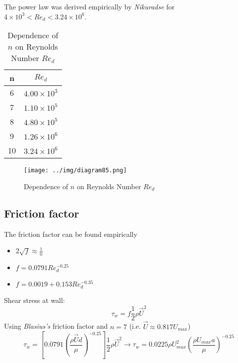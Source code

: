 \documentclass[class=report, crop=false, 12pt,a4paper]{standalone}
\begin{document}
The power law was derived empirically by \textit{Nikuradse} for $4\times10^3 < Re_d < 3.24 \times 10^6$.
\begin{table}[H]
  \begin{center}
  \begin{tabular}{|c|c|}
    \hline
    \textbf{n} & \textbf{$Re_d$}\\
    \hline
    \hline
    6 & $4.00 \times 10^3$\\
    \hline
    7 & $1.10 \times 10^5$\\
    \hline
    8 & $4.80 \times 10^5$\\
    \hline
    9 & $1.26 \times 10^6$\\
    \hline
    10 & $3.24 \times 10^6$\\
    \hline 
  \end{tabular}
  \end{center}
  \caption{Dependence of $n$ on Reynolds Number $Re_d$}
\end{table}
\begin{figure}[H]
  \centering
  \texttt{[image: ../img/diagram85.png]}
  \caption{Dependence of $n$ on Reynolds Number $Re_d$}
\end{figure}
\subsection{Friction factor}
The friction factor can be found empirically
\begin{itemize}
  \item {} $2\sqrt{f} \approx \frac{1}{n}$
  \item {} $f = 0.0791 Re_d^{-0.25}$
  \item {} $f=0.0019 + 0.153Re_d^{-0.35}$
\end{itemize}
Shear stress at wall:
\begin{equation}
  \tau_w = f \frac{1}{2} \rho \vec{U}^2
\end{equation}
Using \textit{Blasius's} friction factor and $n=7$ (i.e. $\vec{U} \approx 0.817U_{max}$)
\begin{equation}
  \tau_w = \left[ 0.0791\left(\frac{\rho \vec{U}d}{\mu}\right)^{-0.25} \right] \frac{1}{2}\rho \vec{U}^2 \rightarrow \tau_w = 0.0225 \rho U^2_{max} \left(\frac{\rho U_{max}a}{\mu}\right)^{-0.25}
\end{equation}
\end{document}
